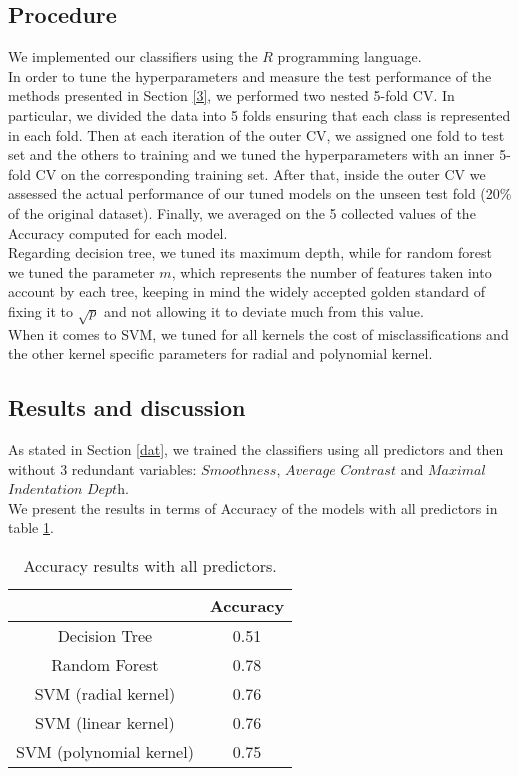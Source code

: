 \documentclass{article}
\begin{document}
\subsection{Procedure}
We implemented our classifiers using the $R$ programming language.
\\In order to tune the hyperparameters and measure the test performance of the methods presented in Section \ref{3}, we performed two nested 5-fold CV. 
In particular, we divided the data into 5 folds ensuring that each class is represented in each fold. Then at each iteration of the outer CV, we assigned one fold to test set and the others to training and we tuned the hyperparameters with an inner 5-fold CV on the corresponding training set. After that, inside the outer CV we assessed the actual performance of our tuned models on the unseen test fold (20\% of the original dataset). Finally, we averaged on the 5 collected values of the Accuracy computed for each model.
\\Regarding decision tree, we tuned its maximum depth, while for random forest we tuned the parameter $m$, which represents the number of features taken into account by each tree, keeping in mind the widely accepted golden standard of fixing it to $\sqrt{p}$ and not allowing it to deviate much from this value.
\\When it comes to SVM, we tuned for all kernels the cost of misclassifications and the other kernel specific parameters for radial and polynomial kernel.


\subsection{Results and discussion}
As stated in Section \ref{dat}, we trained the classifiers using all predictors and then without $3$ redundant variables: $\textit{Smoothness}$, $\textit{Average Contrast}$ and $\textit{Maximal}$ $\textit{Indentation Depth}$. 
\\We present the results in terms of Accuracy of the models with all predictors in table \ref{table1}. 
\begin{table}[ht]
 \centering
\begin{tabular}{ |c|c|} \hline
 & Accuracy \\
\hline
Decision Tree & 0.51 \\ 
\hline
 Random Forest & 0.78  \\ 
\hline
 SVM (radial kernel) & 0.76 \\ 
\hline
 SVM (linear kernel) & 0.76 \\ 
\hline
 SVM (polynomial kernel) & 0.75 \\ 
\hline
\end{tabular}
\caption{Accuracy results with all predictors.}\label{table1}
\end{table}
\end{document}
